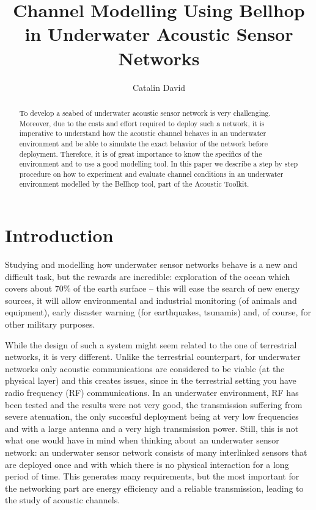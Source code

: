 \documentclass[a4paper]{IEEEtran}
\begin{document}
\author{Catalin David}
\title{Channel Modelling Using Bellhop in Underwater Acoustic Sensor Networks}

\maketitle
\begin{abstract}
To develop a seabed of underwater acoustic sensor network is very
challenging. Moreover, due to the costs and effort required to deploy
such a network, it is imperative to understand how the acoustic
channel behaves in an underwater environment and be able to simulate
the exact behavior of the network before deployment.
Therefore, it is of great importance to know the
specifics of the environment and to use a good modelling tool.
In this paper we describe a step by step procedure on how to experiment and
evaluate channel conditions in an underwater environment modelled by
the Bellhop tool, part of the Acoustic Toolkit.
\end{abstract}

\section{Introduction}
Studying and modelling how underwater sensor networks behave is a new and
difficult task, but the rewards are incredible: exploration of the ocean which
covers about 70\% of the earth surface -- this will ease the search of new
energy sources, it will allow environmental and industrial monitoring (of
animals and equipment), early disaster warning (for earthquakes, tsunamis) and,
of course, for other military purposes.

While the design of such a system might seem related to the one of terrestrial
networks, it is very different. Unlike the terrestrial counterpart, for
underwater networks only acoustic communications are considered to be viable (at
the physical layer) and this creates issues, since in the terrestrial setting
you have radio frequency (RF) communications. In an underwater environment, RF
has been tested and the results were not very good, the transmission suffering
from severe atenuation, the only succesful deployment being at very low
frequencies and with a large antenna and a very high transmission power. Still,
this is not what one would have in mind when thinking about an underwater sensor
network: an underwater sensor network consists of many interlinked sensors that
are deployed once and with which there is no physical interaction for a long
period of time. This generates many requirements, but the most important for the
networking part are energy efficiency and a reliable transmission, leading to
the study of acoustic channels.
\end{document}
